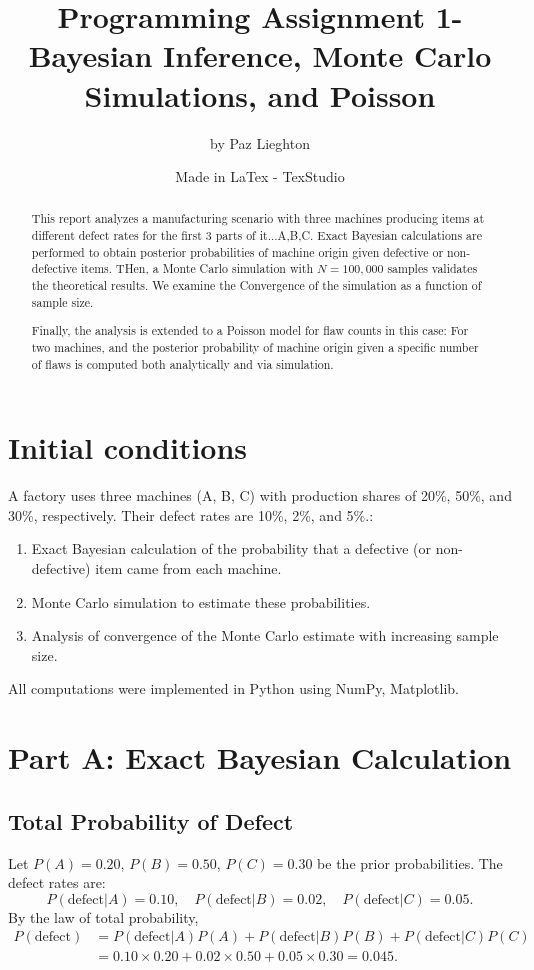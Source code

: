 \documentclass[11pt]{article}
\title{\textbf{Programming Assignment 1- Bayesian Inference, Monte Carlo Simulations, and Poisson}}
\author{by Paz Lieghton}
\date{Made in LaTex - TexStudio}
\begin{document}
	
	\maketitle
	
	\begin{abstract}
		This report analyzes a manufacturing scenario with three machines producing items at different defect rates for the first 3 parts of it...A,B,C. Exact Bayesian calculations are performed to obtain posterior probabilities of machine origin given defective or non-defective items. THen, a Monte Carlo simulation with \(N=100{,}000\) samples validates the theoretical results. We examine the Convergence of the simulation as a function of sample size. 
		
		Finally, the analysis is extended to a Poisson model for flaw counts in this case: For two machines, and the posterior probability of machine origin given a specific number of flaws is computed both analytically and via simulation.
	\end{abstract}
	
	\section{Initial conditions}
	A factory uses three machines (A, B, C) with production shares of 20\%, 50\%, and 30\%, respectively. Their defect rates are 10\%, 2\%, and 5\%.:
	\begin{enumerate}
		\item Exact Bayesian calculation of the probability that a defective (or non-defective) item came from each machine.
		\item Monte Carlo simulation to estimate these probabilities.
		\item Analysis of convergence of the Monte Carlo estimate with increasing sample size.
	\end{enumerate}
	All computations were implemented in Python using NumPy, Matplotlib.
	
	\section{Part A: Exact Bayesian Calculation}
	\subsection{Total Probability of Defect}
	Let \(P(A)=0.20\), \(P(B)=0.50\), \(P(C)=0.30\) be the prior probabilities. The defect rates are:
	\[
	P(\text{defect}|A)=0.10,\quad P(\text{defect}|B)=0.02,\quad P(\text{defect}|C)=0.05.
	\]
	By the law of total probability,
	\begin{align*}
		P(\text{defect}) &= P(\text{defect}|A)P(A) + P(\text{defect}|B)P(B) + P(\text{defect}|C)P(C) \\
		&= 0.10\times0.20 + 0.02\times0.50 + 0.05\times0.30 = 0.045.
	\end{align*}
	
\end{document}

